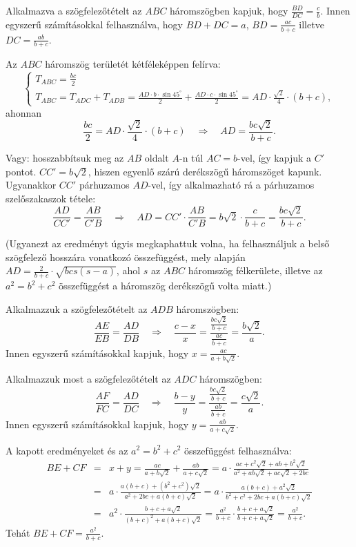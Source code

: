\documentclass[a4paper,10pt]{article}
\begin{document}
Alkalmazva a szögfelezőtételt az $ABC$ háromszögben kapjuk, hogy $\frac{BD}{DC}=\frac{c}{b}$.
Innen egyszerű szá\-mí\-tá\-sok\-kal felhasználva, hogy $BD+DC=a$, $BD=\frac{ac}{b+c}$ illetve $DC=\frac{ab}{b+c}$.

Az $ABC$ háromszög területét kétféleképpen felírva:
$$\left\{
\begin{array}{l}
T_{ABC}=\frac{bc}{2}\\
T_{ABC}=T_{ADC}+T_{ADB}=\frac{AD\cdot b\cdot \sin 45^\circ}{2}+\frac{AD\cdot c\cdot \sin 45^\circ}{2}=AD\cdot \frac{\sqrt{2}}{4}\cdot (b+c),
\end{array}
\right.$$
ahonnan $$\frac{bc}{2}=AD\cdot \frac{\sqrt{2}}{4}\cdot (b+c) \quad \Rightarrow \quad AD=\frac{bc\sqrt{2}}{b+c}.$$

Vagy: hosszabbítsuk meg az $AB$ oldalt $A$-n túl $AC=b$-vel, így kapjuk a $C'$ pontot. $CC'=b\sqrt{2}$, hiszen egyenlő szárú derékszögű háromszöget kapunk. Ugyanakkor $CC'$ párhuzamos $AD$-vel, így alkalmazható rá a párhuzamos szelőszakaszok tétele:
$$\frac{AD}{CC'}=\frac{AB}{C'B} \quad \Rightarrow \quad AD=CC'\cdot \frac{AB}{C'B}=b\sqrt{2}\cdot \frac{c}{b+c}=\frac{bc\sqrt{2}}{b+c}.$$

(Ugyanezt az eredményt úgyis megkaphattuk volna, ha felhasználjuk a belső szögfelező hosszára vonatkozó összefüggést, mely alapján $AD=\frac{2}{b+c}\cdot \sqrt{bcs(s-a)}$, ahol $s$ az $ABC$ háromszög félkerülete, illetve az $a^2=b^2+c^2$ összefüggést a háromszög derékszögű volta miatt.)

Alkalmazzuk a szögfelezőtételt az $ADB$ háromszögben:
$$\frac{AE}{EB}=\frac{AD}{DB} \quad \Rightarrow \quad \frac{c-x}{x}=\frac{\frac{bc\sqrt{2}}{b+c}}{\frac{ac}{b+c}}=\frac{b\sqrt{2}}{a}.$$
Innen egyszerű számításokkal kapjuk, hogy $x=\frac{ac}{a+b\sqrt{2}}$.

Alkalmazzuk most a szögfelezőtételt az $ADC$ háromszögben:
$$\frac{AF}{FC}=\frac{AD}{DC}\quad \Rightarrow \quad \frac{b-y}{y}=\frac{\frac{bc\sqrt{2}}{b+c}}{\frac{ab}{b+c}}=\frac{c\sqrt{2}}{a}.$$
Innen egyszerű számításokkal kapjuk, hogy $y=\frac{ab}{a+c\sqrt{2}}$.

A kapott eredményeket és az $a^2=b^2+c^2$ összefüggést felhasználva:
\begin{eqnarray*}
BE+CF & = & x+y = \frac{ac}{a+b\sqrt{2}}+\frac{ab}{a+c\sqrt{2}} = a\cdot \frac{ac+c^2\sqrt2+ab+b^2\sqrt2}{a^2+ab\sqrt2+ac\sqrt2+2bc} \\
& = & a\cdot \frac{a(b+c)+(b^2+c^2)\sqrt2}{a^2+2bc+a(b+c)\sqrt2} = a\cdot \frac{a(b+c)+a^2\sqrt2}{b^2+c^2+2bc+a(b+c)\sqrt2} \\
& = & a^2\cdot \frac{b+c+a\sqrt{2}}{(b+c)^2+a(b+c)\sqrt2} = \frac{a^2}{b+c}\cdot \frac{b+c+a\sqrt2}{b+c+a\sqrt2} = \frac{a^2}{b+c}.
\end{eqnarray*}
Tehát $BE+CF=\frac{a^2}{b+c}$.
\end{document}
